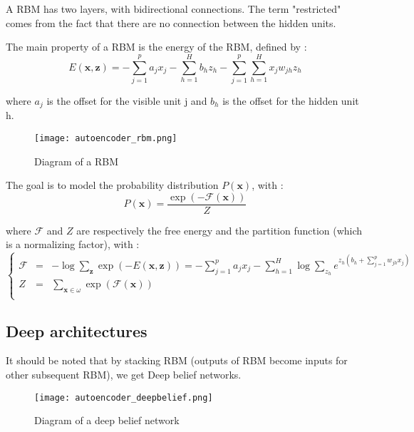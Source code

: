 \documentclass{article}
\begin{document}
A RBM has two layers, with bidirectional connections. The term "restricted" comes from the fact that there are no connection between the hidden units.

The main property of a RBM is the energy of the RBM, defined by : \[E(\textbf{x},\textbf{z}) = - \sum\limits_{j=1}^p a_jx_j - \sum\limits_{h=1}^H b_hz_h - \sum\limits_{j=1}^p\sum\limits_{h=1}^H x_jw_{jh}z_h\]

where $a_j$ is the offset for the visible unit j and $b_h$ is the offset for the hidden unit h.

\begin{figure}[!h]
    \center
    \texttt{[image: autoencoder\_rbm.png]}
    \caption{Diagram of a RBM}
\end{figure}

The goal is to model the probability distribution $P(\textbf{x})$, with : \[P(\textbf{x}) = \frac{\exp(-\mathcal{F}(\textbf{x}))}{Z}\]

where $\mathcal{F}$ and $Z$ are respectively the free energy and the partition function (which is a normalizing factor), with :
\[ 
\left\{
  \begin{array}{rcc}
    \mathcal{F} & = & - \log\sum\limits_{\textbf{z}}\exp(-E(\textbf{x},\textbf{z})) = - \sum\limits_{j=1}^p a_jx_j - \sum\limits_{h=1}^H\log\sum\limits_{z_h}e^{z_h(b_h+\sum_{j=1}^pw_{jh}x_j)}\\
    Z & = & \sum\limits_{\textbf{x}\in\omega}\exp(\mathcal{F}(\textbf{x}))\\
  \end{array}
\right.
\]

\subsection{Deep architectures}
It should be noted that by stacking RBM (outputs of RBM become inputs for other subsequent RBM), we get Deep belief networks.

\begin{figure}[!h]
    \center
    \texttt{[image: autoencoder\_deepbelief.png]}
    \caption{Diagram of a deep belief network}
\end{figure}
\end{document}
